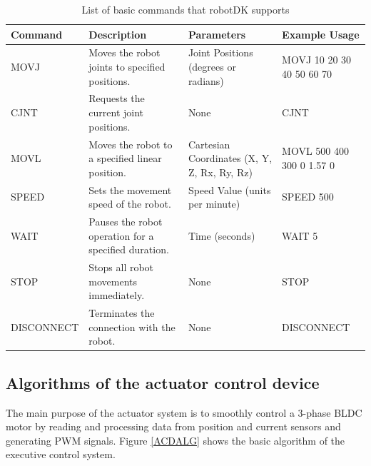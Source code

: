 \begin{table}[H]
	\caption{List of basic commands that robotDK supports}\label{TRobotDK}
	\begin{adjustbox}{width=\textwidth}

		\begin{tabular}{|l|l|l|l|}
			\hline
			Command    & Description                                             & Parameters                                     & Example 			Usage             \\ \hline
			MOVJ       & Moves 			the robot joints to specified positions.       & Joint 			Positions (degrees or radians)        & MOVJ 			10 20 30 40 50 60 70 \\ \hline
			CJNT       & Requests 			the current joint positions.                & None                                           & CJNT                         \\ \hline
			MOVL       & Moves 			the robot to a specified linear position.      & Cartesian 			Coordinates (X, Y, Z, Rx, Ry, Rz) & MOVL 			500 400 300 0 1.57 0 \\ \hline
			SPEED      & Sets 			the movement speed of the robot.                & Speed 			Value (units per minute)              & SPEED 			500                 \\ \hline
			WAIT       & Pauses 			the robot operation for a specified duration. & Time 			(seconds)                              & WAIT 			5                    \\ \hline
			STOP       & Stops 			all robot movements immediately.               & None                                           & STOP                         \\ \hline
			DISCONNECT & Terminates 			the connection with the robot.            & None                                           & DISCONNECT                   \\ \hline
		\end{tabular}
	\end{adjustbox}

\end{table}

\subsection{Algorithms of the actuator control device}
The main purpose of the actuator system is to smoothly control a 3-phase BLDC motor by reading and processing data from position and current sensors and generating PWM signals. Figure \ref{ACDALG} shows the basic algorithm of the executive control system.


